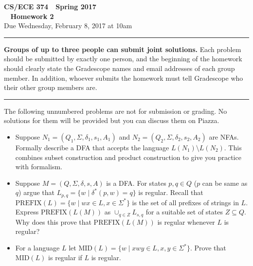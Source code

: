 \documentclass[11pt]{article}
\begin{document}

\thispagestyle{empty}

\begin{center}
\Large\textbf{CS/ECE 374 \,\decosix\,  Spring 2017}%
\\
\LARGE\textbf{\decothreeleft~ Homework 2 ~\decothreeright}%
\\[0.5ex]
\large Due Wednesday, February 8, 2017 at 10am
\end{center}

\bigskip
\hrule
\bigskip

\noindent
\textbf{Groups of up to three people can submit joint solutions.}  Each problem should be submitted by exactly one person, and the beginning of the homework should clearly state the Gradescope names and email addresses of each group member.  In addition, whoever submits the homework must tell Gradescope who their other group members are.
\bigskip
\hrule
\bigskip


\noindent
The following unnumbered problems are not for submission or grading. 
No solutions for them will be provided but you can discuss them on Piazza.
\begin{itemize}
\item Suppose $N_1=(Q_1,\Sigma, \delta_1, s_1, A_1)$
and $N_2=(Q_2,\Sigma, \delta_2, s_2, A_2)$ are NFAs. Formally
describe a DFA that accepts the language $L(N_1) \setminus L(N_2)$.
This combines subset construction and product construction to give
you practice with formalism.

\item Suppose $M = (Q,\Sigma,\delta,s,A)$ is a DFA.  For states $p,q
  \in Q$ ($p$ can be same as $q$) argue that $L_{p,q} = \{w \mid
  \delta^*(p,w) = q\}$ is regular.  Recall that $\text{PREFIX}(L) = \{
  w \mid wx \in L, x \in \Sigma^*\}$ is the set of all prefixes of
  strings in $L$. Express $\text{PREFIX}(L(M))$ as 
  $\cup_{q \in Z} L_{s,q}$ for a suitable set of states $Z \subseteq Q$.
  Why does this prove that $\text{PREFIX}(L(M))$ is regular whenever $L$ is
  regular?

\item For a language $L$ let $\text{MID}(L) = \{ w \mid xwy \in L, x,
  y \in \Sigma^* \}$. Prove that $\text{MID}(L)$ is regular if
  $L$ is regular.
\end{itemize}

\vspace{1cm}
\end{document}
